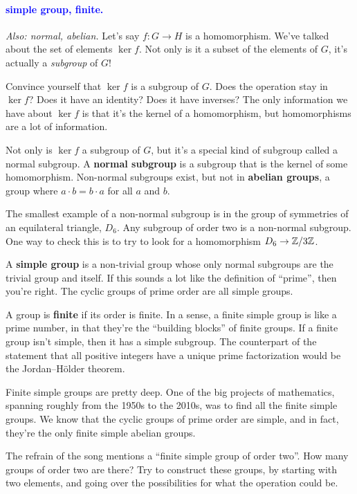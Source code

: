 \documentclass[11pt,paper=letter]{scrartcl}
\renewcommand{\bluebf}[1]{{\bfseries \color{Blue} #1}}
\renewcommand\wp[1]{\paragraph{\textcolor{Blue}{#1.}} \hspace{-1em}}
\newcommand\wl[1]{\label{w:#1}}
\newcommand\oww[1]{\textit{Also: #1.}}
\begin{document}
\wp{simple group, finite}
\wl{simple group}
\wl{finite}
\oww{normal, abelian}
Let's say $f : G \to H$ is a homomorphism. We've talked about the set of elements $\ker f$. Not only is it a subset of the elements of $G$, it's actually a \textit{subgroup} of $G$!

\begin{exrboxed}
  Convince yourself that $\ker f$ is a subgroup of $G$. Does the operation stay in $\ker f$? Does it have an identity? Does it have inverses? The only information we have about $\ker f$ is that it's the kernel of a homomorphism, but homomorphisms are a lot of information.
\end{exrboxed}

Not only is $\ker f$ a subgroup of $G$, but it's a special kind of subgroup called a normal subgroup. A \textbf{normal subgroup} is a subgroup that is the kernel of some homomorphism. Non-normal subgroups exist, but not in \textbf{abelian groups}, a group where $a \cdot b = b \cdot a$ for all $a$ and $b$.

\begin{remboxed}
  The smallest example of a non-normal subgroup is in the group of symmetries of an equilateral triangle, $D_6$. Any subgroup of order two is a non-normal subgroup. One way to check this is to try to look for a homomorphism $D_6 \to \mathbb Z/3\mathbb Z$.
\end{remboxed}

A \bluebf{simple group} is a non-trivial group whose only normal subgroups are the trivial group and itself. If this sounds a lot like the definition of ``prime'', then you're right. The cyclic groups of prime order are all simple groups.

A group is \bluebf{finite} if its order is finite. In a sense, a finite simple group is like a prime number, in that they're the ``building blocks'' of finite groups. If a finite group isn't simple, then it has a simple subgroup. The counterpart of the statement that all positive integers have a unique prime factorization would be the Jordan--H\"older theorem.

Finite simple groups are pretty deep. One of the big projects of mathematics, spanning roughly from the 1950s to the 2010s, was to find all the finite simple groups. We know that the cyclic groups of prime order are simple, and in fact, they're the only finite simple abelian groups.

\begin{exrboxed}
  The refrain of the song mentions a ``finite simple group of order two''. How many groups of order two are there? Try to construct these groups, by starting with two elements, and going over the possibilities for what the operation could be.
\end{exrboxed}
\end{document}
